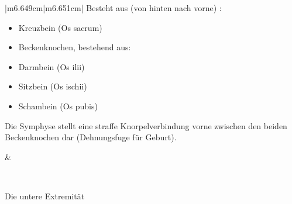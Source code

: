 \documentclass{article}
\begin{document}
\begin{center}
\tablehead{}\begin{supertabular}{|m{6.649cm}|m{6.651cm}|}
\hline
Besteht aus (von hinten nach vorne) :

\begin{itemize}
\item Kreuzbein (Os sacrum)

\item Beckenknochen, bestehend aus:

\end{itemize}
\begin{itemize}
\item {}Darmbein (Os ilii)

\item {}Sitzbein (Os ischii)

\item {}Schambein (Os pubis)

\end{itemize}
Die Symphyse stellt eine straffe Knorpelverbindung vorne
zwischen den beiden Beckenknochen dar (Dehnungs\-fuge f\"ur Geburt).

 &
 \par

\\\hline
\end{supertabular}
\end{center}
Die untere Extremit\"at
\end{document}
